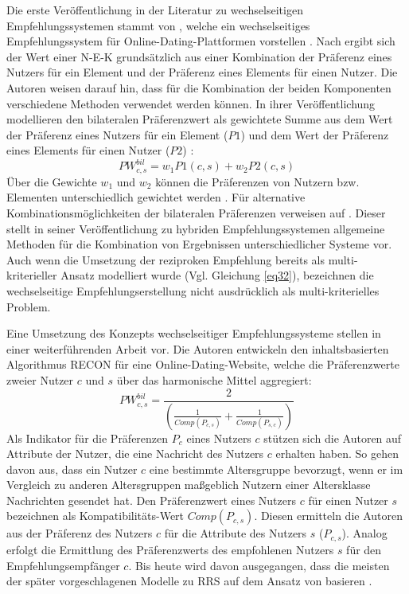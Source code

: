 Die erste Veröffentlichung in der Literatur zu wechselseitigen Empfehlungssystemen stammt von \textcite[S. 1ff.]{pizzato:inproceedings}, welche ein wechselseitiges Empfehlungssystem für Online-Dating-Plattformen vorstellen \cite[S. 1469]{yildirim:article}.
Nach \textcite[S. 5]{pizzato:inproceedings} ergibt sich der Wert einer \ac{N-E-K} grundsätzlich aus einer Kombination der Präferenz eines Nutzers für ein Element und der Präferenz eines Elements für einen Nutzer.
Die Autoren weisen darauf hin, dass für die Kombination der beiden Komponenten verschiedene Methoden verwendet werden können.
In ihrer Veröffentlichung modellieren \textcite[S. 6]{pizzato:inproceedings} den bilateralen Präferenzwert als gewichtete Summe aus dem Wert der Präferenz eines Nutzers für ein Element ($P1$) und dem Wert der Präferenz eines Elements für einen Nutzer ($P2$) \cite[S. 6]{pizzato:inproceedings}:
\begin{equation}\label{eq32}
    PW_{c,s}^{bil} = w_{1}P1(c,s) + w_{2}P2(c,s)
\end{equation}
Über die Gewichte $w_{1}$ und $w_{2}$ können die Präferenzen von Nutzern bzw. Elementen unterschiedlich gewichtet werden \cite[S. 6]{pizzato:inproceedings}.
Für alternative Kombinationsmöglichkeiten der bilateralen Präferenzen verweisen \textcite[S. 5]{pizzato:inproceedings} auf \textcite[S. 339ff.]{burke:article}.
Dieser stellt in seiner Veröffentlichung zu hybriden Empfehlungssystemen allgemeine Methoden für die Kombination von Ergebnissen unterschiedlicher Systeme vor.
Auch wenn die Umsetzung der reziproken Empfehlung bereits als multi-kriterieller Ansatz modelliert wurde (Vgl. Gleichung \ref{eq32}), bezeichnen \textcite[S. 1ff.]{pizzato:inproceedings} die wechselseitige Empfehlungserstellung nicht ausdrücklich als multi-kriterielles Problem. 

Eine Umsetzung des Konzepts wechselseitiger Empfehlungssysteme stellen \textcite[S. 207ff.]{pizzato:2010} in einer weiterführenden Arbeit vor.
Die Autoren entwickeln den inhaltsbasierten Algorithmus RECON für eine Online-Dating-Website, welche die Präferenzwerte zweier Nutzer $c$ und $s$ über das harmonische Mittel aggregiert:
\begin{equation}\label{eq33}
    PW_{c,s}^{bil} = \frac{2}{(\frac{1}{Comp(P_{c,s})}+\frac{1}{Comp(P_{s,c})})}
\end{equation}
Als Indikator für die Präferenzen $P_{c}$ eines Nutzers $c$ stützen sich die Autoren auf Attribute der Nutzer, die eine Nachricht des Nutzers $c$ erhalten haben.
So gehen \textcite[S. 210]{pizzato:2010} davon aus, dass ein Nutzer $c$ eine bestimmte Altersgruppe bevorzugt, wenn er im Vergleich zu anderen Altersgruppen maßgeblich Nutzern einer Altersklasse Nachrichten gesendet hat.
Den Präferenzwert eines Nutzers $c$ für einen Nutzer $s$ bezeichnen \textcite[S. 210]{pizzato:2010} als Kompatibilitäts-Wert $Comp(P_{c,s})$.
Diesen ermitteln die Autoren aus der Präferenz des Nutzers $c$ für die Attribute des Nutzers $s$ ($P_{c,s}$).
Analog erfolgt die Ermittlung des Präferenzwerts des empfohlenen Nutzers $s$ für den Empfehlungsempfänger $c$.
Bis heute wird davon ausgegangen, dass die meisten der später vorgeschlagenen Modelle zu \ac{RRS} auf dem Ansatz von \textcite[S. 207ff.]{pizzato:2010} basieren \cite[S. 723]{kumari:article}.

